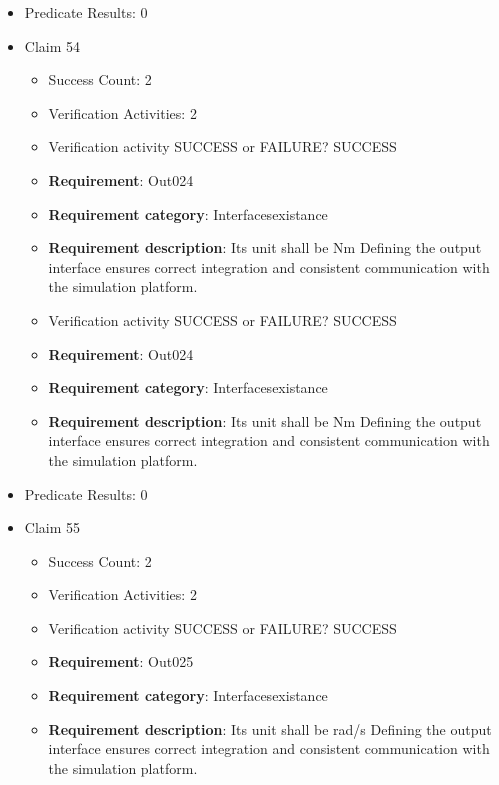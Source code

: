 \documentclass{article}
\begin{document}
\begin{itemize}
\begin{itemize}
				\end{itemize}
				
									    
				\item Predicate Results: 0

  				  \item Claim 54
				\begin{itemize}
			    	\item Success Count: 2 
			    	\item Verification Activities: 2
					\item Verification activity SUCCESS or FAILURE? SUCCESS
		
						\item \textbf{Requirement}: Out024 
						\item \textbf{Requirement category}: Interfacesexistance 
						\item \textbf{Requirement description}: Its unit shall be Nm Defining the output interface ensures correct integration and consistent communication with the simulation platform.
					
					\item Verification activity SUCCESS or FAILURE? SUCCESS
		
						\item \textbf{Requirement}: Out024 
						\item \textbf{Requirement category}: Interfacesexistance 
						\item \textbf{Requirement description}: Its unit shall be Nm Defining the output interface ensures correct integration and consistent communication with the simulation platform.
					
				\end{itemize}
				
									    
				\item Predicate Results: 0

  				  \item Claim 55
				\begin{itemize}
			    	\item Success Count: 2 
			    	\item Verification Activities: 2
					\item Verification activity SUCCESS or FAILURE? SUCCESS
		
						\item \textbf{Requirement}: Out025 
						\item \textbf{Requirement category}: Interfacesexistance 
						\item \textbf{Requirement description}: Its unit shall be rad/s Defining the output interface ensures correct integration and consistent communication with the simulation platform.
					

\end{itemize}
\end{itemize}
\end{document}
